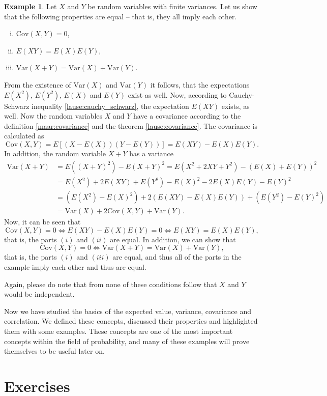 \documentclass[12pt,a4paper,leqno]{report}
\newcommand{\var}{\mathrm{Var}}
\newcommand{\cov}{\mathrm{Cov}}
\theoremstyle{plain}
\theoremstyle{definition}
\newtheorem{esim}[equation]{Example}
\begin{document}
\begin{esim}
Let $X$ and $Y$ be random variables with finite variances. Let us show that the following properties are equal -- that is, they all imply each other.
\begin{enumerate}[(i)]
\item $\cov(X,Y) = 0$,
\item $E(XY) = E(X)E(Y)$,
\item $\var(X + Y) = \var(X) + \var(Y)$.
\end{enumerate}

From the existence of $\var(X)$ and $\var(Y)$ it follows, that the expectations $E(X^2)$, $E(Y^2)$, $E(X)$ and $E(Y)$ exist as well. Now, according to Cauchy-Schwarz inequality \ref{lause:cauchy_schwarz}, the expectation $E(XY)$ exists, as well. Now the random variables $X$ and $Y$ have a covariance according to the definition \ref{maar:covariance} and the theorem \ref{lause:covariance}. The covariance is calculated as 
\[
\cov(X, Y) = E[(X-E(X))(Y-E(Y))] = E(XY) - E(X)E(Y).
\]
In addition, the random variable $X+Y$ has a variance
\[
\begin{split}
\var(X+Y) &= E((X+Y)^2) - E(X+Y)^2 = E(X^2+2XY+Y^2) - (E(X)+E(Y))^2 \\
&= E(X^2) + 2E(XY) + E(Y^2) - E(X)^2 -2E(X)E(Y) - E(Y)^2 \\
&= (E(X^2) -E(X)^2) +2(E(XY)-E(X)E(Y)) + (E(Y^2) -E(Y)^2) \\
&= \var(X) + 2\cov(X, Y) + \var(Y).
\end{split}
\]
Now, it can be seen that
\[
\cov(X, Y) = 0 \Leftrightarrow E(XY) - E(X)E(Y) = 0 \Leftrightarrow E(XY) = E(X)E(Y),
\]
that is, the parts $(i)$ and $(ii)$ are equal. In addition, we can show that
\[
\cov(X,Y) = 0 \Leftrightarrow \var(X+Y) = \var(X) + \var(Y),
\]
that is, the parts $(i)$ and $(iii)$ are equal, and thus all of the parts in the example imply each other and thus are equal.

Again, please do note that from none of these conditions follow that $X$ and $Y$ would be independent.
\end{esim}

Now we have studied the basics of the expected value, variance, covariance and correlation. We defined these concepts, discussed their properties and highlighted them with some examples. These concepts are one of the most important concepts within the field of probability, and many of these examples will prove themselves to be useful later on.

\section{Exercises}
\end{document}
